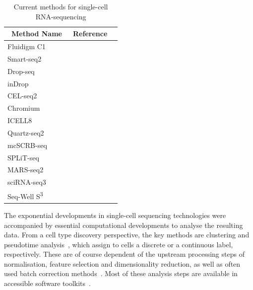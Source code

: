 \begin{table}[ht!] %
\footnotesize
\caption[Current methods for single-cell RNA-seq]{Current methods for single-cell RNA-sequencing}
\centering
\label{table:tab_1_1}
\begin{tabular}{l|l|c}
\toprule
~\textbf{Method Name} & ~\textbf{Reference}  \\
\midrule
Fluidigm C1 & ~\citep{brennecke_accounting_2013}  \\

Smart-seq2 & ~\citep{picelli_full-length_2014}  \\

Drop-seq & ~\citep{macosko_highly_2015}  \\

inDrop & ~\citep{klein_droplet_2015}  \\

CEL-seq2 & ~\citep{hashimshony_cel-seq2:_2016}  \\

Chromium & ~\citep{zheng_massively_2017}  \\

ICELL8 & ~\citep{goldstein_massively_2017}  \\

Quartz-seq2 & ~\citep{sasagawa_quartz-seq2:_2018}  \\

mcSCRB-seq & ~\citep{bagnoli_sensitive_2018}  \\

SPLiT-seq & ~\citep{rosenberg_single-cell_2018}  \\

MARS-seq2 & ~\citep{keren-shaul_mars-seq2.0:_2019}  \\

sciRNA-seq3 & ~\citep{cao_single-cell_2019}  \\

Seq-Well S\textsuperscript{3} & ~\citep{hughes_highly_2019}  \\

\bottomrule
\end{tabular}
\end{table}

The exponential developments in single-cell sequencing technologies were accompanied by essential computational developments to analyse the resulting data. From a cell type discovery perspective, the key methods are clustering and pseudotime analysis~\citep{rostom_computational_2017}, which assign to cells a discrete or a continuous label, respectively. These are of course dependent of the upstream processing steps of normalisation, feature selection and dimensionality reduction, as well as often used batch correction methods~\citep{luecken_current_2019}. Most of these analysis steps are available in accessible software toolkits~\citep{mccarthy_scater:_2017,butler_integrating_2018,wolf_scanpy:_2018}.

